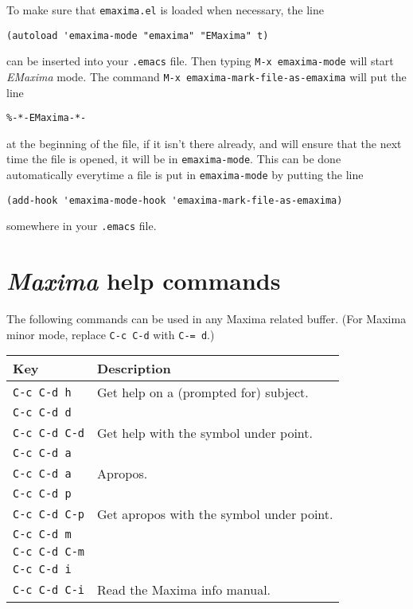 \documentclass{article}
\newcommand{\emx}{\textsl{\sffamily EMaxima}}
\newcommand{\mx}{\textsl{\sffamily Maxima}}
\newcommand{\hyph}{-\hspace{0pt}}
\begin{document}
To make sure that \texttt{emaxima.el} is loaded when necessary, the line
\begin{verbatim}
(autoload 'emaxima-mode "emaxima" "EMaxima" t)
\end{verbatim}
\noindent
can be inserted into your \texttt{.emacs} file.  Then typing
\texttt{M-x emaxima\hyph{}mode} will start \emx{} mode.  The command 
\texttt{M-x emaxima\hyph{}mark\hyph{}file\hyph{}as\hyph{}emaxima} will put the line
\begin{verbatim}
%-*-EMaxima-*-
\end{verbatim}
\noindent
at the beginning of the file, if it isn't there already, and will ensure
that the next time the file is opened, it will be in \texttt{emaxima\hyph{}mode}.  
This can be done automatically everytime a file is put in
\texttt{emaxima\hyph{}mode} by putting the line
\begin{verbatim}
(add-hook 'emaxima-mode-hook 'emaxima-mark-file-as-emaxima)
\end{verbatim}
\noindent
somewhere in your \texttt{.emacs} file.


\section{\mx{} help commands}

The following commands can be used in any Maxima related buffer.  (For
Maxima minor mode, replace \texttt{C-c C-d} with \texttt{C-= d}.)

\smallskip

\noindent
\begin{tabular}{p{\firstcol}p{\secondcol}}
\hline
\textbf{Key} & \textbf{Description}\\
\hline
\texttt{C-c C-d h}
& Get help on a (prompted for) subject.\\
\texttt{C-c C-d d} \\
\texttt{C-c C-d C-d}
& Get help with the symbol under point.\\
\texttt{C-c C-d a}\\
\texttt{C-c C-d a} & Apropos.\\
\texttt{C-c C-d p}\\
\texttt{C-c C-d C-p} & Get apropos with the symbol under point.\\
\texttt{C-c C-d m}\\
\texttt{C-c C-d C-m}\\
\texttt{C-c C-d i}\\
\texttt{C-c C-d C-i} & Read the Maxima info manual.
\end{tabular}
\end{document}

